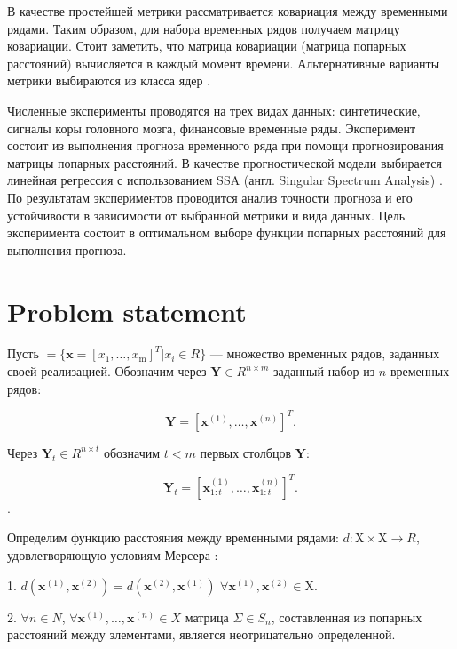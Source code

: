 \documentclass{article}
\begin{document}
В качестве простейшей метрики рассматривается ковариация между временными рядами. \cite{Boyd} Таким образом, для набора временных рядов получаем матрицу ковариации. Стоит заметить, что матрица ковариации (матрица попарных расстояний) вычисляется в каждый момент времени. Альтернативные варианты метрики выбираются из класса ядер \cite{shawe2004kernel}.

Численные эксперименты проводятся на трех видах данных: синтетические, сигналы коры головного мозга, финансовые временные ряды. Эксперимент состоит из выполнения прогноза временного ряда при помощи прогнозирования матрицы попарных расстояний. В качестве прогностической модели выбирается линейная регрессия с использованием SSA (англ. Singular Spectrum Analysis) \cite{vautard1992singular}. По результатам экспериментов проводится анализ точности прогноза и его устойчивости в зависимости от выбранной метрики и вида данных. Цель эксперимента состоит в оптимальном выборе функции попарных расстояний для выполнения прогноза.

\section{Problem statement}

Пусть  $ = \{\mathbf{x} = [x_1, \ldots, x_\text{m}]^T | x_i \in R\}$ --- множество временных рядов, заданных своей реализацией. Обозначим через  $\mathbf{Y} \in R^{n \times m}$ заданный набор из $n$ временных рядов:

\begin{equation}
    \mathbf{Y} = [\mathbf{x}^{(1)}, \ldots, \mathbf{x}^{(n)}]^T.
\end{equation}

 Через $\mathbf{Y}_t \in R^{n \times t}$ обозначим $t < m$ первых столбцов $\mathbf{Y}$: 
 
 \begin{equation}
    \mathbf{Y}_t = [\mathbf{x}_{1:t}^{(1)}, \ldots, \mathbf{x}_{1:t}^{(n)}]^T.
\end{equation}. 

Определим функцию расстояния между временными рядами: $d : \text{X} \times \text{X} \rightarrow R$, удовлетворяющую условиям Мерсера \cite{ghojogh2021reproducing}:

1. $d(\mathbf{x}^{(1)}, \mathbf{x}^{(2)}) = d(\mathbf{x}^{(2)}, \mathbf{x}^{(1)})$ $\forall \mathbf{x}^{(1)}, \mathbf{x}^{(2)} \in \text{X}$.

2. $\forall n \in N$, $\forall \mathbf{x}^{(1)}, \ldots, \mathbf{x}^{(n)} \in X$ матрица $\Sigma \in S_n$, составленная из попарных расстояний между элементами, является неотрицательно определенной.
\end{document}
